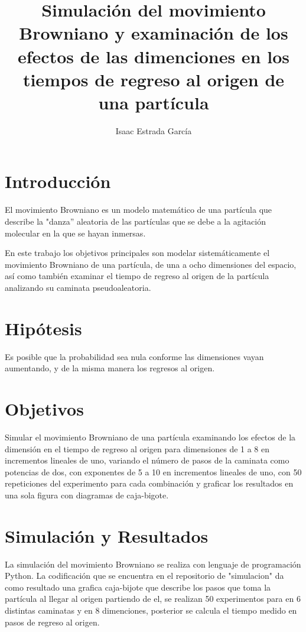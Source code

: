 \documentclass{article}
\title{Simulaci\'{o}n del movimiento Browniano y examinaci\'{o}n de los efectos de las dimenciones en los tiempos de regreso al origen de una part\'{i}cula}
\author{Isaac Estrada Garc\'{i}a }
\begin{document}
\maketitle

\section{Introducci\'{o}n}
El movimiento Browniano es un modelo matem\'{a}tico de una part\'{i}cula que describe la "danza'' aleatoria de las part\'{i}culas que se debe \citep{mov} a la agitaci\'{o}n molecular en la que se hayan inmersas.

En este trabajo los objetivos principales son modelar sistem\'{a}ticamente el movimiento Browniano de una part\'{i}cula, de una a ocho dimensiones del espacio, as\'{i} como tambi\'{e}n examinar el tiempo de regreso al origen de la part\'{i}cula analizando su caminata pseudoaleatoria.

\section{Hip\'{o}tesis}
Es posible que la probabilidad sea nula conforme las dimensiones vayan aumentando, y de la misma manera los regresos al origen.

\section{Objetivos}
Simular el movimiento Browniano \citep{elis} de una part\'{i}cula examinando los efectos de la dimensi\'{o}n en el tiempo de regreso al origen para dimensiones de 1 a 8 en incrementos lineales de uno, variando el n\'{u}mero de pasos de la caminata como potencias de dos, con exponentes de 5 a 10 en incrementos lineales de uno, con 50 repeticiones del experimento para cada combinaci\'{o}n y graficar los resultados en una sola figura con diagramas de caja-bigote. 

\section{Simulaci\'{o}n y Resultados}

La simulaci\'{o}n del movimiento Browniano se realiza con lenguaje de programaci\'{o}n Python. La codificaci\'{o}n que se encuentra en el repositorio de "simulacion" da como resultado una grafica caja-bijote que describe los pasos que toma la part\'{i}cula al llegar al origen partiendo de el, se realizan 50 experimentos para en 6 distintas caminatas y en 8 dimenciones, posterior se calcula el tiempo medido en pasos de regreso al origen.
\end{document}
